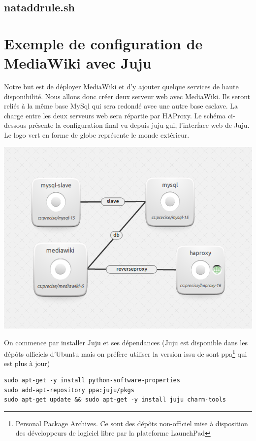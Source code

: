 \documentclass[a4paper,oneside]{report}
\begin{document}
\subsection{nataddrule.sh}
\section{Exemple de configuration de MediaWiki avec Juju} \label{auto:juju}

Notre but est de déployer MediaWiki et d'y ajouter quelque services de haute disponibilité. Nous allons donc créer deux serveur web avec MediaWiki. Ils seront reliés à la même base MySql qui sera redondé avec une autre base esclave. La charge entre les deux serveurs web sera répartie par HAProxy. Le schéma ci-dessous présente la configuration final vu depuis juju-gui, l'interface web de Juju. Le logo vert en forme de globe représente le monde extérieur.
\begin{center}
\includegraphics[scale=0.75]{images/butJuju.png}
\end{center}

On commence par installer Juju et ses dépendances (Juju est disponible dans les dépôts officiels d'Ubuntu mais on préfère utiliser la version issu de sont ppa\footnote{Personal Package Archives. Ce sont des dépôts non-officiel mise à disposition des développeurs de logiciel libre par la plateforme LaunchPad} qui est plus à jour)
\begin{verbatim}
sudo apt-get -y install python-software-properties
sudo add-apt-repository ppa:juju/pkgs
sudo apt-get update && sudo apt-get -y install juju charm-tools
\end{verbatim}
\end{document}
